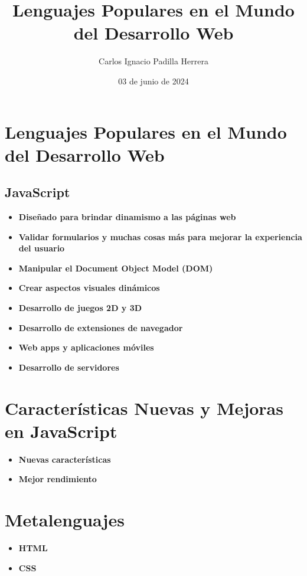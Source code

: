 \documentclass{article}
\title{Lenguajes Populares en el Mundo del Desarrollo Web}
\author{Carlos Ignacio Padilla Herrera}
\date{03 de junio de 2024}
\begin{document}
\maketitle

\section*{Lenguajes Populares en el Mundo del Desarrollo Web}

\subsection*{JavaScript}
\begin{itemize}
    \item \textbf{Diseñado para brindar dinamismo a las páginas web}
    \item \textbf{Validar formularios y muchas cosas más para mejorar la experiencia del usuario}
    \item \textbf{Manipular el Document Object Model (DOM)}
    \item \textbf{Crear aspectos visuales dinámicos}
    \item \textbf{Desarrollo de juegos 2D y 3D}
    \item \textbf{Desarrollo de extensiones de navegador}
    \item \textbf{Web apps y aplicaciones móviles}
    \item \textbf{Desarrollo de servidores}
\end{itemize}

\section*{Características Nuevas y Mejoras en JavaScript}
\begin{itemize}
    \item \textbf{Nuevas características}
    \item \textbf{Mejor rendimiento}
\end{itemize}

\section*{Metalenguajes}
\begin{itemize}
    \item \textbf{HTML}
    \item \textbf{CSS}
\end{itemize}
\end{document}
